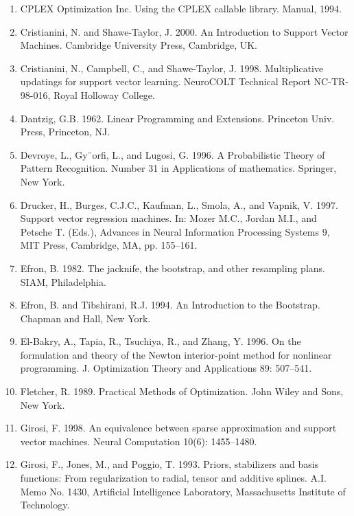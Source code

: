 \documentclass[fleqn,10pt]{olplainarticle}
\begin{document}
\begin{enumerate}
    \item CPLEX Optimization Inc. Using the CPLEX callable library. Manual, 1994.

    \item Cristianini, N. and Shawe-Taylor, J. 2000. An Introduction to Support Vector Machines. Cambridge University Press, Cambridge, UK.

    \item Cristianini, N., Campbell, C., and Shawe-Taylor, J. 1998. Multiplicative updatings for support vector learning. NeuroCOLT Technical Report NC-TR-98-016, Royal Holloway College.

    \item Dantzig, G.B. 1962. Linear Programming and Extensions. Princeton Univ. Press, Princeton, NJ.

    \item Devroye, L., Gy¨orfi, L., and Lugosi, G. 1996. A Probabilistic Theory of Pattern Recognition. Number 31 in Applications of mathematics. Springer, New York.

    \item Drucker, H., Burges, C.J.C., Kaufman, L., Smola, A., and Vapnik, V. 1997. Support vector regression machines. In: Mozer M.C., Jordan M.I., and Petsche T. (Eds.), Advances in Neural Information Processing Systems 9, MIT Press, Cambridge, MA, pp. 155–161.

    \item Efron, B. 1982. The jacknife, the bootstrap, and other resampling plans. SIAM, Philadelphia.

    \item Efron, B. and Tibshirani, R.J. 1994. An Introduction to the Bootstrap. Chapman and Hall, New York.

    \item El-Bakry, A., Tapia, R., Tsuchiya, R., and Zhang, Y. 1996. On the formulation and theory of the Newton interior-point method for nonlinear programming. J. Optimization Theory and Applications 89: 507–541.

    \item Fletcher, R. 1989. Practical Methods of Optimization. John Wiley and Sons, New York.

    \item Girosi, F. 1998. An equivalence between sparse approximation and support vector machines. Neural Computation 10(6): 1455–1480.

    \item Girosi, F., Jones, M., and Poggio, T. 1993. Priors, stabilizers and basis functions: From regularization to radial, tensor and additive splines. A.I. Memo No. 1430, Artificial Intelligence Laboratory, Massachusetts Institute of Technology.


\end{enumerate}
\end{document}

